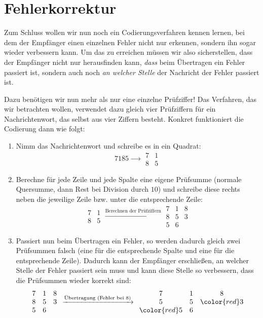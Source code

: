\documentclass[a4paper,ngerman,12pt]{scrartcl}
\theoremstyle{definition}
\theoremstyle{plain}
\theoremstyle{remark}
\begin{document}
\newpage
\section{Fehlerkorrektur}

Zum Schluss wollen wir nun noch ein Codierungsverfahren kennen lernen, bei dem der Empfänger einen einzelnen Fehler nicht nur erkennen, sondern ihn sogar wieder verbessern kann. Um das zu erreichen müssen wir also sicherstellen, dass der Empfänger nicht nur herausfinden kann, \emph{dass} beim Übertragen ein Fehler passiert ist, sondern auch noch \emph{an welcher Stelle} der Nachricht der Fehler passiert ist.

Dazu benötigen wir nun mehr als nur eine einzelne Prüfziffer! Das Verfahren, das wir betrachten wollen, verwendet dazu gleich vier Prüfziffern für ein Nachrichtenwort, das selbst aus vier Ziffern besteht. Konkret funktioniert die Codierung dann wie folgt:

\begin{enumerate}
	\item Nimm das Nachrichtenwort und schreibe es in ein Quadrat:
		\[7185 \xrightarrow{\hspace{2em}} \begin{array}{cc}7 & 1 \\8 & 5\end{array}\]
	\item Berechne für jede Zeile und jede Spalte eine eigene Prüfsumme (normale Quersumme, dann Rest bei Division durch $10$) und schreibe diese rechts neben die jeweilige Zeile bzw. unter die entsprechende Zeile:
		\[\begin{array}{cc}7 & 1 \\8 & 5\end{array} \xrightarrow{\text{Berechnen der Prüfziffern}} \begin{array}{ccc}7 & 1 & 8\\8 & 5 & 3 \\ 5 & 6 &\end{array}\]
	\item Passiert nun beim Übertragen ein Fehler, so werden dadurch gleich zwei Prüfsummen falsch (eine für die entsprechende Spalte und eine für die entsprechende Zeile). Dadurch kann der Empfänger erschließen, an welcher Stelle der Fehler passiert sein muss und kann diese Stelle so verbessern, dass die Prüfsummen wieder korrekt sind:
		\[\begin{array}{ccc}7 & 1 & 8\\8 & 5 & 3 \\ 5 & 6 &\end{array} \xrightarrow{\text{Übertragung (Fehler bei 8)}} \begin{array}{ccc}7 & 1 & 8\\5 & 5 & {\color{red}3} \\ {\color{red}5} & 6 &\end{array}\]
\end{enumerate}
\end{document}
